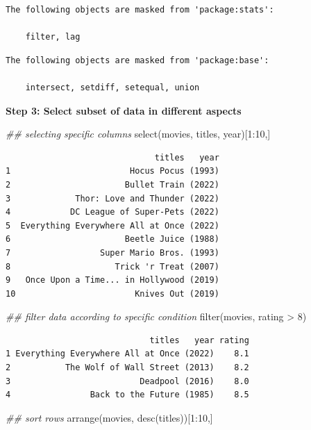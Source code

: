 \documentclass[
  letterpaper,
  DIV=11,
  numbers=noendperiod]{scrreprt}
\newenvironment{Shaded}{\begin{snugshade}}{\end{snugshade}}
\newcommand{\DecValTok}[1]{\textcolor[rgb]{0.68,0.00,0.00}{#1}}
\newcommand{\DocumentationTok}[1]{\textcolor[rgb]{0.37,0.37,0.37}{\textit{#1}}}
\newcommand{\FunctionTok}[1]{\textcolor[rgb]{0.28,0.35,0.67}{#1}}
\newcommand{\NormalTok}[1]{\textcolor[rgb]{0.00,0.23,0.31}{#1}}
\newcommand{\SpecialCharTok}[1]{\textcolor[rgb]{0.37,0.37,0.37}{#1}}
\begin{document}
\begin{verbatim}
The following objects are masked from 'package:stats':

    filter, lag
\end{verbatim}

\begin{verbatim}
The following objects are masked from 'package:base':

    intersect, setdiff, setequal, union
\end{verbatim}

\textbf{Step 3: Select subset of data in different aspects}

\begin{Shaded}
\begin{Highlighting}[]
\DocumentationTok{\#\# selecting specific columns}
\FunctionTok{select}\NormalTok{(movies, titles, year)[}\DecValTok{1}\SpecialCharTok{:}\DecValTok{10}\NormalTok{,]}
\end{Highlighting}
\end{Shaded}

\begin{verbatim}
                              titles   year
1                        Hocus Pocus (1993)
2                       Bullet Train (2022)
3             Thor: Love and Thunder (2022)
4            DC League of Super-Pets (2022)
5  Everything Everywhere All at Once (2022)
6                       Beetle Juice (1988)
7                  Super Mario Bros. (1993)
8                     Trick 'r Treat (2007)
9   Once Upon a Time... in Hollywood (2019)
10                        Knives Out (2019)
\end{verbatim}

\begin{Shaded}
\begin{Highlighting}[]
\DocumentationTok{\#\# filter data according to specific condition}
\FunctionTok{filter}\NormalTok{(movies, rating }\SpecialCharTok{\textgreater{}} \DecValTok{8}\NormalTok{)}
\end{Highlighting}
\end{Shaded}

\begin{verbatim}
                             titles   year rating
1 Everything Everywhere All at Once (2022)    8.1
2           The Wolf of Wall Street (2013)    8.2
3                          Deadpool (2016)    8.0
4                Back to the Future (1985)    8.5
\end{verbatim}

\begin{Shaded}
\begin{Highlighting}[]
\DocumentationTok{\#\# sort rows}
\FunctionTok{arrange}\NormalTok{(movies, }\FunctionTok{desc}\NormalTok{(titles))[}\DecValTok{1}\SpecialCharTok{:}\DecValTok{10}\NormalTok{,]}
\end{Highlighting}
\end{Shaded}
\end{document}

